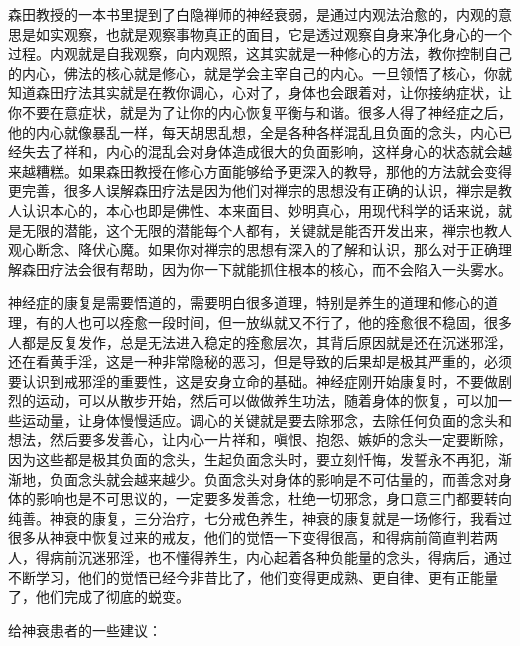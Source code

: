 森田教授的一本书里提到了白隐禅师的神经衰弱，是通过内观法治愈的，内观的意思是如实观察，也就是观察事物真正的面目，它是透过观察自身来净化身心的一个过程。内观就是自我观察，向内观照，这其实就是一种修心的方法，教你控制自己的内心，佛法的核心就是修心，就是学会主宰自己的内心。一旦领悟了核心，你就知道森田疗法其实就是在教你调心，心对了，身体也会跟着对，让你接纳症状，让你不要在意症状，就是为了让你的内心恢复平衡与和谐。很多人得了神经症之后，他的内心就像暴乱一样，每天胡思乱想，全是各种各样混乱且负面的念头，内心已经失去了祥和，内心的混乱会对身体造成很大的负面影响，这样身心的状态就会越来越糟糕。如果森田教授在修心方面能够给予更深入的教导，那他的方法就会变得更完善，很多人误解森田疗法是因为他们对禅宗的思想没有正确的认识，禅宗是教人认识本心的，本心也即是佛性、本来面目、妙明真心，用现代科学的话来说，就是无限的潜能，这个无限的潜能每个人都有，关键就是能否开发出来，禅宗也教人观心断念、降伏心魔。如果你对禅宗的思想有深入的了解和认识，那么对于正确理解森田疗法会很有帮助，因为你一下就能抓住根本的核心，而不会陷入一头雾水。

神经症的康复是需要悟道的，需要明白很多道理，特别是养生的道理和修心的道理，有的人也可以痊愈一段时间，但一放纵就又不行了，他的痊愈很不稳固，很多人都是反复发作，总是无法进入稳定的痊愈层次，其背后原因就是还在沉迷邪淫，还在看黄手淫，这是一种非常隐秘的恶习，但是导致的后果却是极其严重的，必须要认识到戒邪淫的重要性，这是安身立命的基础。神经症刚开始康复时，不要做剧烈的运动，可以从散步开始，然后可以做做养生功法，随着身体的恢复，可以加一些运动量，让身体慢慢适应。调心的关键就是要去除邪念，去除任何负面的念头和想法，然后要多发善心，让内心一片祥和，嗔恨、抱怨、嫉妒的念头一定要断除，因为这些都是极其负面的念头，生起负面念头时，要立刻忏悔，发誓永不再犯，渐渐地，负面念头就会越来越少。负面念头对身体的影响是不可估量的，而善念对身体的影响也是不可思议的，一定要多发善念，杜绝一切邪念，身口意三门都要转向纯善。神衰的康复，三分治疗，七分戒色养生，神衰的康复就是一场修行，我看过很多从神衰中恢复过来的戒友，他们的觉悟一下变得很高，和得病前简直判若两人，得病前沉迷邪淫，也不懂得养生，内心起着各种负能量的念头，得病后，通过不断学习，他们的觉悟已经今非昔比了，他们变得更成熟、更自律、更有正能量了，他们完成了彻底的蜕变。

给神衰患者的一些建议：

